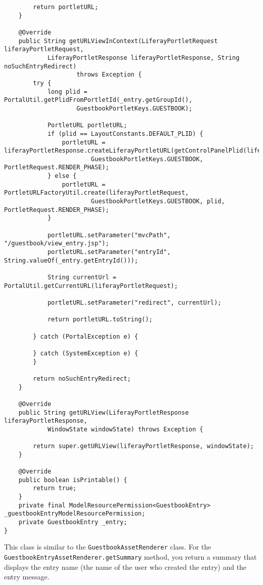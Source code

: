 \begin{verbatim}
        return portletURL;
    }

    @Override
    public String getURLViewInContext(LiferayPortletRequest liferayPortletRequest,
            LiferayPortletResponse liferayPortletResponse, String noSuchEntryRedirect) 
                    throws Exception {
        try {
            long plid = PortalUtil.getPlidFromPortletId(_entry.getGroupId(),
                    GuestbookPortletKeys.GUESTBOOK);

            PortletURL portletURL;
            if (plid == LayoutConstants.DEFAULT_PLID) {
                portletURL = liferayPortletResponse.createLiferayPortletURL(getControlPanelPlid(liferayPortletRequest),
                        GuestbookPortletKeys.GUESTBOOK, PortletRequest.RENDER_PHASE);
            } else {
                portletURL = PortletURLFactoryUtil.create(liferayPortletRequest,
                        GuestbookPortletKeys.GUESTBOOK, plid, PortletRequest.RENDER_PHASE);
            }

            portletURL.setParameter("mvcPath", "/guestbook/view_entry.jsp");
            portletURL.setParameter("entryId", String.valueOf(_entry.getEntryId()));

            String currentUrl = PortalUtil.getCurrentURL(liferayPortletRequest);

            portletURL.setParameter("redirect", currentUrl);

            return portletURL.toString();

        } catch (PortalException e) {

        } catch (SystemException e) {
        }

        return noSuchEntryRedirect;
    }

    @Override
    public String getURLView(LiferayPortletResponse liferayPortletResponse, 
            WindowState windowState) throws Exception {

        return super.getURLView(liferayPortletResponse, windowState);
    }

    @Override
    public boolean isPrintable() {
        return true;
    }
    private final ModelResourcePermission<GuestbookEntry> _guestbookEntryModelResourcePermission;
    private GuestbookEntry _entry;
}
\end{verbatim}

This class is similar to the \texttt{GuestbookAssetRenderer} class. For
the \texttt{GuestbookEntryAssetRenderer.getSummary} method, you return a
summary that displays the entry name (the name of the user who created
the entry) and the entry message.

